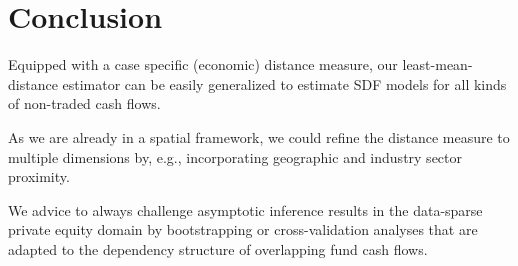 \documentclass[12pt]{article}
\begin{document}
\section{Conclusion}
\label{sec:conclusion}

Equipped with a case specific (economic) distance measure, our least-mean-distance estimator can be easily generalized to estimate SDF models for all kinds of non-traded cash flows.

As we are already in a spatial framework, we could refine the distance measure to multiple dimensions by, e.g., incorporating geographic and industry sector proximity.

We advice to always challenge asymptotic inference results in the data-sparse private equity domain by bootstrapping or cross-validation analyses that are adapted to the dependency structure of overlapping fund cash flows.










\newpage


\end{document}
